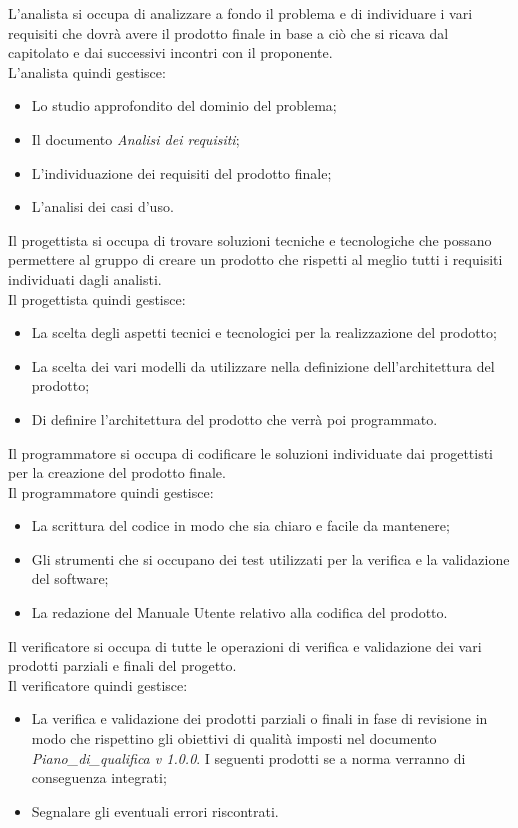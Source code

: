 	L'analista si occupa di analizzare a fondo il problema e di individuare i vari requisiti che dovrà avere il prodotto finale in base a ciò che si ricava dal capitolato e dai successivi incontri con il proponente. \\
	L'analista quindi gestisce:
	\begin{itemize}
		\item Lo studio approfondito del dominio del problema;
		\item Il documento \textit{Analisi dei requisiti};
		\item L'individuazione dei requisiti del prodotto finale;
		\item L'analisi dei casi d'uso.
	\end{itemize}
	Il progettista si occupa di trovare soluzioni tecniche e tecnologiche che possano permettere al gruppo di creare un prodotto che rispetti al meglio tutti i requisiti individuati dagli analisti. \\
	Il progettista quindi gestisce:
	\begin{itemize}
		\item La scelta degli aspetti tecnici e tecnologici per la realizzazione del prodotto;
		\item La scelta dei vari modelli da utilizzare nella definizione dell'architettura del prodotto;
		\item Di definire l'architettura del prodotto che verrà poi programmato.
	\end{itemize}
	Il programmatore si occupa di codificare le soluzioni individuate dai progettisti per la creazione del prodotto finale. \\
	Il programmatore quindi gestisce:
	\begin{itemize}
		\item La scrittura del codice in modo che sia chiaro e facile da mantenere;
		\item Gli strumenti che si occupano dei test utilizzati per la verifica e la validazione del software;
		\item La redazione del Manuale Utente relativo alla codifica del prodotto.
	\end{itemize}
	Il verificatore si occupa di tutte le operazioni di verifica e validazione dei vari prodotti parziali e finali del progetto. \\
	Il verificatore quindi gestisce:
	\begin{itemize}
		\item La verifica e validazione dei prodotti parziali o finali in fase di revisione in modo che rispettino gli obiettivi di qualità imposti nel documento \textit{Piano\_di\_qualifica v 1.0.0}. I seguenti prodotti se a norma verranno di conseguenza integrati;
		\item Segnalare gli eventuali errori riscontrati.
	\end{itemize}
